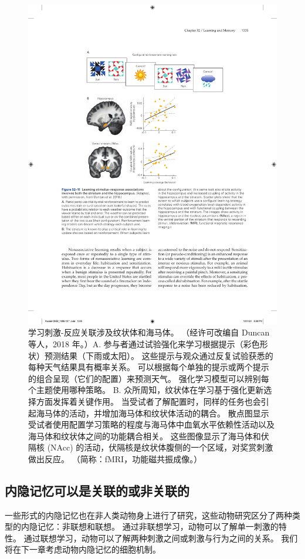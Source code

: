 \begin{figure}[htbp]
	\centering
	\includegraphics[width=0.75\linewidth]{chap52/fig_52_11}
	\caption{学习刺激-反应关联涉及纹状体和海马体。 （经许可改编自 Duncan 等人，2018 年。）A. 参与者通过试验强化来学习根据提示（彩色形状）预测结果（下雨或太阳）。 这些提示与观众通过反复试验获悉的每种天气结果具有概率关系。 可以根据每个单独的提示或两个提示的组合呈现（它们的配置）来预测天气。 强化学习模型可以辨别每个主题使用哪种策略。 B. 众所周知，纹状体在学习基于强化更新选择方面发挥着关键作用。 当受试者了解配置时，同样的任务也会引起海马体的活动，并增加海马体和纹状体活动的耦合。 散点图显示受试者使用配置学习策略的程度与海马体中血氧水平依赖性活动以及海马体和纹状体之间的功能耦合相关。 这些图像显示了海马体和伏隔核 (NAcc) 的活动，伏隔核是纹状体腹侧的一个区域，对奖赏刺激做出反应。 （简称：fMRI，功能磁共振成像。）}
	\label{fig:52_11}
\end{figure}



\subsection{内隐记忆可以是关联的或非关联的}

一些形式的内隐记忆也在非人类动物身上进行了研究，这些动物研究区分了两种类型的内隐记忆：非联想和联想。
通过非联想学习，动物可以了解单一刺激的特性。
通过联想学习，动物可以了解两种刺激之间或刺激与行为之间的关系。
我们将在下一章考虑动物内隐记忆的细胞机制。


